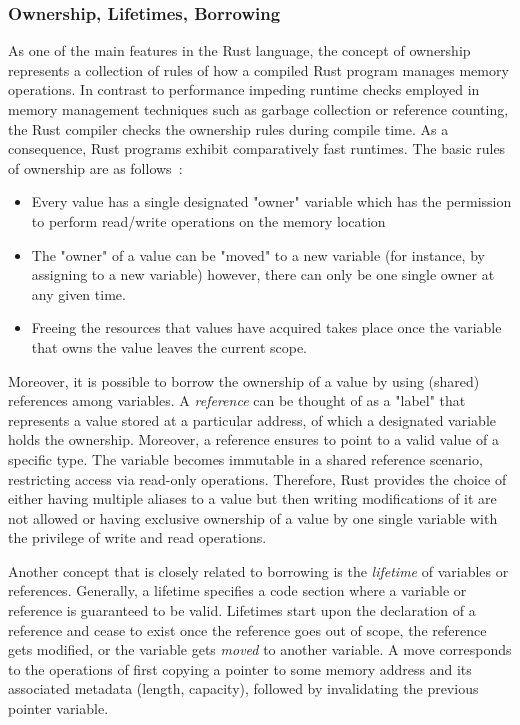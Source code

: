 \documentclass[11pt,
  oneside,openany,    %
]{scrreprt}
\begin{document}
\subsubsection{Ownership, Lifetimes, Borrowing}
As one of the main features in the Rust language, the concept of ownership represents a collection of rules of how a compiled Rust program manages memory operations. In contrast to performance impeding runtime checks employed in memory management techniques such as garbage collection or reference counting, the Rust compiler checks the ownership rules during compile time. As a consequence, Rust programs exhibit comparatively fast runtimes. The basic rules of ownership are as follows~\cite{rustBook, rustForRustaceans}:

\begin{itemize}
    \item Every value has a single designated "owner" variable which has the permission to perform read/write operations on the memory location
    \item The "owner" of a value can be "moved" to a new variable (for instance, by assigning to a new variable) however, there can only be one single owner at any given time.
    \item Freeing the resources that values have acquired takes place once the variable that owns the value leaves the current scope.
\end{itemize}

Moreover, it is possible to borrow the ownership of a value by using (shared) references among variables. A \textit{reference} can be thought of as a "label" that represents a value stored at a particular address, of which a designated variable holds the ownership. Moreover, a reference ensures to point to a valid value of a specific type. The variable becomes immutable in a shared reference scenario, restricting access via read-only operations. Therefore, Rust provides the choice of either having multiple aliases to a value but then writing modifications of it are not allowed or having exclusive ownership of a value by one single variable with the privilege of write and read operations. 

Another concept that is closely related to borrowing is the \textit{lifetime} of variables or references. Generally, a lifetime specifies a code section where a variable or reference is guaranteed to be valid. Lifetimes start upon the declaration of a reference and cease to exist once the reference goes out of scope, the reference gets modified, or the variable gets \textit{moved} to another variable. A move corresponds to the operations of first copying a pointer to some memory address and its associated metadata (length, capacity), followed by invalidating the previous pointer variable.
\end{document}
